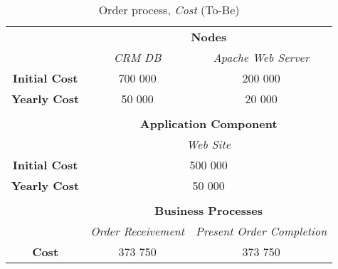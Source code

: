 \begin{table}[H]
	\centering
	\begin{tabular}{|c|c|p{2cm}|p{2.5cm}|p{2.5cm}|p{2.5cm}|}
		\cline{3-6}

		\multicolumn{2}{c}{} & \multicolumn{4}{|c|}{\textbf{Nodes}} \\ \cline{3-6}
		\multicolumn{2}{c|}{} & \multicolumn{2}{c|}{\textsl{CRM DB}} & \multicolumn{2}{c|}{\textsl{Apache Web Server}} \\
		\hline
		\multicolumn{2}{|c|}{\textbf{Initial Cost}} & \multicolumn{2}{c|}{700 000} & \multicolumn{2}{c|}{200 000} \\ \hline
		\multicolumn{2}{|c|}{\textbf{Yearly Cost}}  & \multicolumn{2}{c|}{50 000} & \multicolumn{2}{c|}{20 000} \\ \hline
		
		\multicolumn{6}{c}{} \\ \cline{3-6}
		\multicolumn{2}{c}{} & \multicolumn{4}{|c|}{\textbf{Application Component}} \\ \cline{3-6}
		\multicolumn{2}{c|}{} & \multicolumn{4}{c|}{\textsl{Web Site}} \\
		\hline
		\multicolumn{2}{|c|}{\textbf{Initial Cost}} & \multicolumn{4}{c|}{500 000}  \\ \hline
		\multicolumn{2}{|c|}{\textbf{Yearly Cost}}  & \multicolumn{4}{c|}{50 000}  \\ \hline

		\multicolumn{6}{c}{} \\ \cline{3-6}
		\multicolumn{2}{c}{} & \multicolumn{4}{|c|}{\textbf{Business Processes}} \\ \cline{3-6}
		\multicolumn{2}{c|}{} & \multicolumn{2}{c|}{\textsl{Order Receivement}} & \multicolumn{2}{c|}{\textsl{Present Order Completion}} \\
		\hline
		\multicolumn{2}{|c|}{\textbf{Cost}} & \multicolumn{2}{c|}{373 750} & \multicolumn{2}{c|}{373 750} \\ \hline
	\end{tabular}
\caption{Order process, \textsl{Cost} (To-Be)} 
\label{tab:order_cost_to_be}
\end{table}